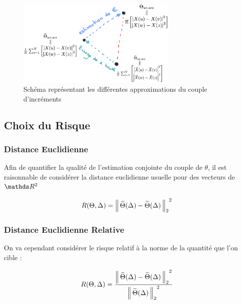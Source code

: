 \begin{figure}[H]
	\centering
	\includegraphics[width=0.7\textwidth]{Images/sketches/theta_biais.png}
	\caption{Schéma représentant les différentes approximations du couple d'incréments}
	\label{fig:sketch_theta_biais}
\end{figure}

\subsection{Choix du Risque}

\subsubsection{Distance Euclidienne}

Afin de quantifier la qualité de l'estimation conjointe du couple de $\theta$, il est raisonnable de considérer la distance euclidienne usuelle pour des vecteurs de $\R 2$

\begin{equation*}
R(\Theta, \Delta) = {\distnorme 2 {\widehat \Theta(\Delta)} {\widetilde \Theta(\Delta)}}^2
\end{equation*}


\subsubsection{Distance Euclidienne Relative}

On va cependant considérer le risque relatif à la norme de la quantité que l'on cible :

\begin{equation*}
R(\Theta, \Delta) =\frac{ {\distnorme 2 {\widehat \Theta(\Delta)} {\widetilde \Theta(\Delta)}}^2}{ {\norme 2 {\widetilde \Theta(\Delta)}}^2 }
\end{equation*}

